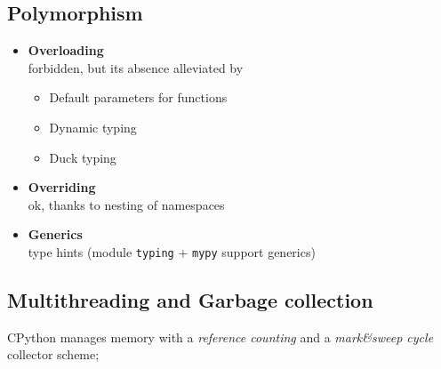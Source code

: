 \subsection{Polymorphism}
\begin{itemize}
   \item \textbf{Overloading}\\
   forbidden, but its absence
   alleviated by
   \begin{itemize}
      \item Default parameters for functions
      \item Dynamic typing
      \item Duck typing
   \end{itemize}
   \item \textbf{Overriding}\\
   ok, thanks to nesting of
   namespaces
   \item \textbf{Generics}\\
   type hints (module \lstinline|typing| + \lstinline|mypy|
   support generics)
\end{itemize}

\subsection{Multithreading and Garbage collection}
CPython manages memory with a \textit{reference counting} and a
\textit{mark\&sweep cycle} collector scheme;

